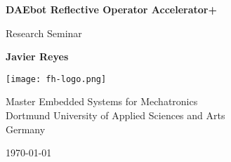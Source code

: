 \begin{titlepage}
  \begin{center}
    \vspace*{2cm}

    \Huge
    \textbf{DAEbot Reflective Operator Accelerator+}

    \vspace{1cm}

    \LARGE
    {Research Seminar}

    \vspace{3cm}

    \textbf{Javier Reyes}

    \vfill

    \vspace{2cm}

    \texttt{[image: fh-logo.png]}

    \vspace{2cm}

    \Large
    {Master Embedded Systems for Mechatronics\\
    Dortmund University of Applied Sciences and Arts\\
    Germany}

    \vspace{0.5cm}

    \large
    {\today}

  \end{center}
\end{titlepage}
